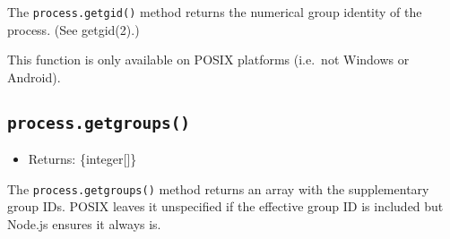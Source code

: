 The \texttt{process.getgid()} method returns the numerical group
identity of the process. (See getgid(2).)

\begin{Shaded}
\begin{Highlighting}[]
   \OperatorTok{;}

\NormalTok{ (}\NormalTok{) \{}
  \NormalTok{(}\SpecialCharTok{$\{}\NormalTok{()}\SpecialCharTok{\}}\VerbatimStringTok{\textasciigrave{}}\NormalTok{)}\OperatorTok{;}
\NormalTok{\}}
\end{Highlighting}
\end{Shaded}

\begin{Shaded}
\begin{Highlighting}[]
  \OperatorTok{=} \NormalTok{(}\NormalTok{)}\OperatorTok{;}

\NormalTok{ (}\NormalTok{) \{}
  \NormalTok{(}\SpecialCharTok{$\{}\NormalTok{()}\SpecialCharTok{\}}\VerbatimStringTok{\textasciigrave{}}\NormalTok{)}\OperatorTok{;}
\NormalTok{\}}
\end{Highlighting}
\end{Shaded}

This function is only available on POSIX platforms (i.e.~not Windows or
Android).

\subsection{\texorpdfstring{\texttt{process.getgroups()}}{process.getgroups()}}\label{process.getgroups}

\begin{itemize}
\tightlist
\item
  Returns: \{integer{[}{]}\}
\end{itemize}

The \texttt{process.getgroups()} method returns an array with the
supplementary group IDs. POSIX leaves it unspecified if the effective
group ID is included but Node.js ensures it always is.

